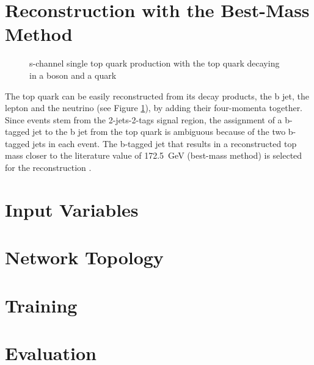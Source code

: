 \section{Reconstruction with the Best-Mass Method}
\begin{figure}[h]
    \centering
    
    \caption{s-channel single top quark production with the top quark decaying in a \PWplus boson and a \Pbottom quark}
    \label{fig:ch_4_single_top_reco}
\end{figure}
The top quark can be easily reconstructed from its decay products, the b jet, the lepton and the neutrino (see Figure \ref{fig:ch_4_single_top_reco}), by adding their four-momenta together. Since events stem from the 2-jets-2-tags signal region, the assignment of a b-tagged jet to the b jet from the top quark is ambiguous because of the two b-tagged jets in each event. The b-tagged jet that results in a reconstructed top mass closer to the literature value of \SI{172.5}{GeV} (best-mass method) is selected for the reconstruction \cite{Fal18}.
\section{Input Variables}
\section{Network Topology}
\section{Training}
\section{Evaluation}

